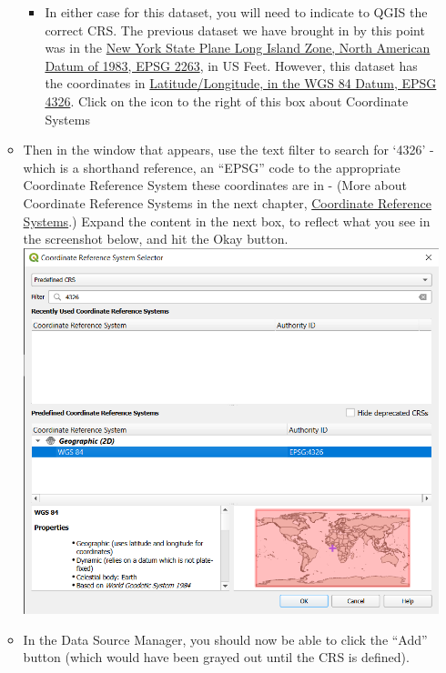 \documentclass[
  letterpaper,
  DIV=11,
  numbers=noendperiod]{scrreprt}
\providecommand{\tightlist}{%
  \setlength{\itemsep}{0pt}\setlength{\parskip}{0pt}}\usepackage{longtable,booktabs,array}
\begin{document}
\begin{itemize}
\begin{itemize}
    \begin{itemize}
    \tightlist
    \item
      In either case for this dataset, you will need to indicate to QGIS
      the correct CRS. The previous dataset we have brought in by this
      point was in the \href{https://epsg.io/2263}{New York State Plane
      Long Island Zone, North American Datum of 1983, EPSG 2263}, in US
      Feet. However, this dataset has the coordinates in
      \href{https://epsg.io/4326}{Latitude/Longitude, in the WGS 84
      Datum, EPSG 4326}. Click on the icon to the right of this box
      about Coordinate Systems
      
    \end{itemize}
  \item
    Then in the window that appears, use the text filter to search for
    `4326' - which is a shorthand reference, an ``EPSG'' code to the
    appropriate Coordinate Reference System these coordinates are in -
    (More about Coordinate Reference Systems in the next chapter,
    \protect\hyperlink{projections}{Coordinate Reference Systems}.)
    Expand the content in the next box, to reflect what you see in the
    screenshot below, and hit the Okay button.
    \includegraphics{./images/defining_crs.png}
  \item
    In the Data Source Manager, you should now be able to click the
    ``Add'' button (which would have been grayed out until the CRS is
    defined).


\end{itemize}
\end{itemize}
\end{document}

